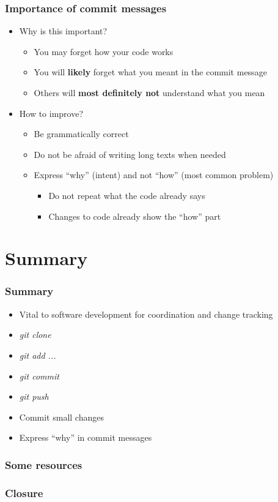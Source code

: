 \documentclass{beamer}
\begin{document}
\begin{frame}
  \frametitle{Importance of commit messages}
  \begin{itemize}
  \item<1-> Why is this important?
    \begin{itemize}
    \item<2-> You may forget how your code works
    \item<3-> You will \textbf{likely} forget what you meant in the commit message
    \item<4-> Others will \textbf{most definitely not} understand what you mean 
    \end{itemize}
  \item<5-> How to improve?
    \begin{itemize}
    \item<6-> Be grammatically correct
    \item<7-> Do not be afraid of writing long texts when needed
    \item<8-> Express ``why'' (intent) and not ``how'' (most common problem)
      \begin{itemize}
      \item <8-> Do not repeat what the code already says
      \item <8-> Changes to code already show the ``how'' part
      \end{itemize}
    \end{itemize}
  \end{itemize}
\end{frame}

\section{Summary}
\begin{frame}
  \frametitle{Summary}
  \begin{itemize}
  \item<1-> Vital to software development for coordination and change tracking
  \item<2->[] \textit{git clone}
  \item<2->[] \textit{git add ...}
  \item<2->[] \textit{git commit}
  \item<2->[] \textit{git push}
  \item<3-> Commit small changes
  \item<4-> Express ``why'' in commit messages
  \end{itemize}
\end{frame}

\begin{frame}
  \frametitle{Some resources}
\end{frame}

\begin{frame}
  \frametitle{Closure}
\end{frame}
\end{document}
